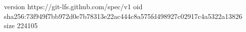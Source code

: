 version https://git-lfs.github.com/spec/v1
oid sha256:73f949f7bb972d0e7b78313e22ac444c8a575fd498927c02917c4a5322a13826
size 224105

